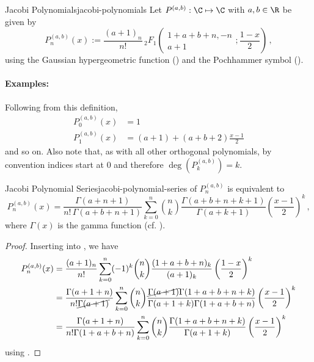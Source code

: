 \begin{definition}{Jacobi Polynomials}{jacobi-polynomials}
  Let $P^{(a, b)}: \C \mapsto \C$ with $a, b \in \R$ be given by
  $$P^{(a,b)}_n(x) := {\frac{(a +1)_{n}}{n!}}\, {}_2F_1\left(\begin{matrix}1+a +b +n, -n \\a + 1\end{matrix}; \frac{1-x}{2}\right)\,,$$
  using the Gaussian hypergeometric function () and the Pochhammer symbol ().
\end{definition}

\paragraph{Examples:}
Following from this definition,
\begin{align*}
  P_0^{(a, b)}(x)   & = 1                            \\
  P_{1}^{(a, b)}(x) & = (a+1)+(a+b+2){\frac{x-1}{2}}
\end{align*}
and so on.
Also note that, as with all other orthogonal polynomials, by convention indices start at $0$ and therefore $\deg\left(P_k^{(a, b)}\right) = k$.

\begin{lemma}{Jacobi Polynomial Series}{jacobi-polynomial-series}
   of $P_n^{(a, b)}$ is equivalent to
  $$P_{n}^{(a, b)}(x)={\frac  {\Gamma (a +n+1)}{n!\,\Gamma (a +b +n+1)}}\sum _{{k=0}}^{n}\binom{n}{k}{\frac{\Gamma (a +b +n+k+1)}{\Gamma (a +k+1)}}\left({\frac{x-1}{2}}\right)^{k}\,,$$
  where $\Gamma(x)$ is the gamma function (cf. ).
\end{lemma}
\begin{proof}
  Inserting into , we have
  \begin{align*}
    P_{n}^{(a, b)}(x) & = \frac{(a+1)_n}{n!} \sum_{k=0}^n (-1)^k \binom{n}{k} \frac{(1+a+b+n)_k}{(a+1)_k} \left(\frac{1-x}{2}\right)^k                                                                        \\
                      & = \frac{\Gamma(a+1+n)}{n! \cancel{\Gamma(a+1)}} \sum_{k=0}^n \binom{n}{k} \frac{\cancel{\Gamma(a+1)} \Gamma(1+a+b+n + k)}{\Gamma(a+1+k) \Gamma(1+a+b+n)} \left(\frac{x-1}{2}\right)^k \\
                      & = \frac{\Gamma(a+1+n)}{n! \Gamma(1+a+b+n)} \sum_{k=0}^n \binom{n}{k} \frac{\Gamma(1+a+b+n + k)}{\Gamma(a+1+k) } \left(\frac{x-1}{2}\right)^k
  \end{align*}
  using .
\end{proof}

